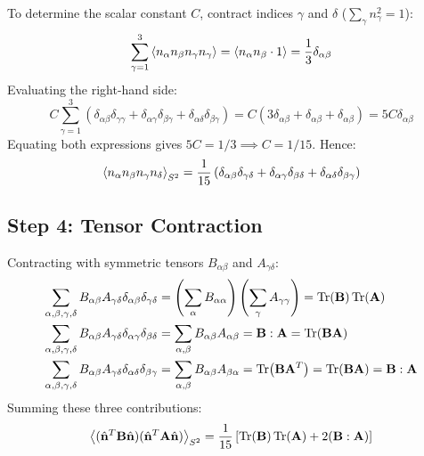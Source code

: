 \documentclass[11pt,a4paper]{article}
\begin{document}
To determine the scalar constant $C$, contract indices $\gamma$ and $\delta$ ($\sum_\gamma n_\gamma^2 = 1$):
\begin{equation}
\sum_{\gamma=1}^3 \ev{n_\alpha n_\beta n_\gamma n_\gamma} = \ev{n_\alpha n_\beta \cdot 1} = \frac{1}{3} \delta_{\alpha\beta}
\end{equation}
Evaluating the right-hand side:
\begin{equation}
C \sum_{\gamma=1}^3 \left( \delta_{\alpha\beta} \delta_{\gamma\gamma} + \delta_{\alpha\gamma} \delta_{\beta\gamma} + \delta_{\alpha\delta} \delta_{\beta\gamma} \right) = C (3 \delta_{\alpha\beta} + \delta_{\alpha\beta} + \delta_{\alpha\beta}) = 5 C \delta_{\alpha\beta}
\end{equation}
Equating both expressions gives $5 C = 1/3 \implies C = 1/15$. Hence:
\begin{equation}
\ev{n_\alpha n_\beta n_\gamma n_\delta}_{S^2} = \frac{1}{15} \left( \delta_{\alpha\beta} \delta_{\gamma\delta} + \delta_{\alpha\gamma} \delta_{\beta\delta} + \delta_{\alpha\delta} \delta_{\beta\gamma} \right)
\end{equation}

\subsection{Step 4: Tensor Contraction}
Contracting with symmetric tensors $B_{\alpha\beta}$ and $A_{\gamma\delta}$:
\begin{align}
\sum_{\alpha, \beta, \gamma, \delta} B_{\alpha\beta} A_{\gamma\delta} \delta_{\alpha\beta} \delta_{\gamma\delta} &= \left( \sum_\alpha B_{\alpha\alpha} \right) \left( \sum_\gamma A_{\gamma\gamma} \right) = \Tr(\mathbf{B}) \Tr(\mathbf{A}) \\
\sum_{\alpha, \beta, \gamma, \delta} B_{\alpha\beta} A_{\gamma\delta} \delta_{\alpha\gamma} \delta_{\beta\delta} &= \sum_{\alpha, \beta} B_{\alpha\beta} A_{\alpha\beta} = \mathbf{B} : \mathbf{A} = \Tr(\mathbf{B} \mathbf{A}) \\
\sum_{\alpha, \beta, \gamma, \delta} B_{\alpha\beta} A_{\gamma\delta} \delta_{\alpha\delta} \delta_{\beta\gamma} &= \sum_{\alpha, \beta} B_{\alpha\beta} A_{\beta\alpha} = \Tr(\mathbf{B} \mathbf{A}^T) = \Tr(\mathbf{B} \mathbf{A}) = \mathbf{B} : \mathbf{A}
\end{align}
Summing these three contributions:
\begin{equation}
\ev{(\hat{\mathbf{n}}^T \mathbf{B} \hat{\mathbf{n}})(\hat{\mathbf{n}}^T \mathbf{A} \hat{\mathbf{n}})}_{S^2} = \frac{1}{15} \left[ \Tr(\mathbf{B}) \Tr(\mathbf{A}) + 2 (\mathbf{B} : \mathbf{A}) \right]
\end{equation}
\end{document}
